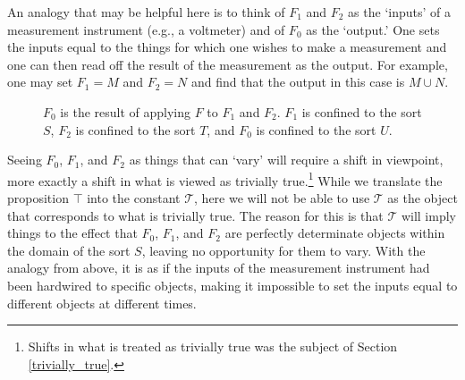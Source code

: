 \documentclass[12pt]{book}
\begin{document}
An analogy that may be helpful here is to think of $F_1$ and $F_2$ as the `inputs’ of a measurement instrument (e.g., a voltmeter) and of $F_0$ as the `output.’ One sets the inputs equal to the things for which one wishes to make a measurement and one can then read off the result of the measurement as the output. For example, one may set $F_1 = M$ and $F_2 = N$ and find that the output in this case is $M \cup N$.

\begin{figure}[htbp]
\centering
{}
\caption{$F_0$ is the result of applying $F$ to $F_1$ and $F_2$. $F_1$ is confined to the sort $S$, $F_2$ is confined to the sort $T$, and $F_0$ is confined to the sort $U$.}
\label{fig:diamonds}
\end{figure}

Seeing $F_0$, $F_1$, and $F_2$ as things that can `vary' will require a shift in viewpoint, more exactly a shift in what is viewed as trivially true.\footnote{Shifts in what is treated as trivially true was the subject of Section \ref{trivially_true}.} While we translate the proposition $\top$ into the constant $\mathcal{T}$, here we will not be able to use $\mathcal{T}$ as the object that corresponds to what is trivially true. The reason for this is that $\mathcal{T}$ will imply things to the effect that $F_0$, $F_1$, and $F_2$ are perfectly determinate objects within the domain of the sort $S$, leaving no opportunity for them to vary. With the analogy from above, it is as if the inputs of the measurement instrument had been hardwired to specific objects, making it impossible to set the inputs equal to different objects at different times.
\end{document}

